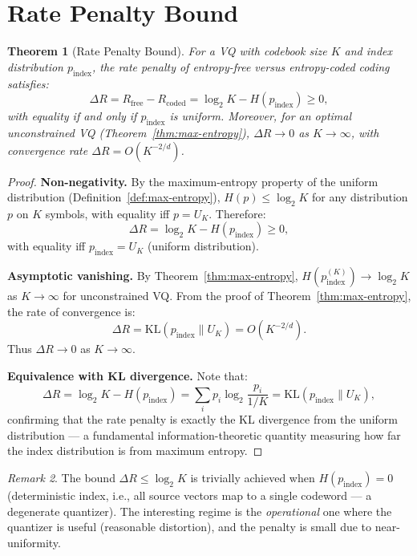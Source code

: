 \documentclass[11pt,a4paper]{article}
\newtheorem{theorem}{Theorem}[section]
\theoremstyle{definition}
\theoremstyle{remark}
\newtheorem{remark}[theorem]{Remark}
\newcommand{\KL}{\mathrm{KL}}
\begin{document}
\section{Rate Penalty Bound}

\begin{theorem}[Rate Penalty Bound]
\label{thm:rate-penalty}
For a VQ with codebook size $K$ and index distribution $p_{\mathrm{index}}$,
the rate penalty of entropy-free versus entropy-coded coding satisfies:
\[
\Delta R = R_{\mathrm{free}} - R_{\mathrm{coded}}
= \log_2 K - H(p_{\mathrm{index}}) \geq 0,
\]
with equality if and only if $p_{\mathrm{index}}$ is uniform.
Moreover, for an optimal unconstrained VQ (Theorem~\ref{thm:max-entropy}),
$\Delta R \to 0$ as $K \to \infty$, with convergence rate
$\Delta R = O(K^{-2/d})$.
\end{theorem}

\begin{proof}
\textbf{Non-negativity.} By the maximum-entropy property of the uniform
distribution (Definition~\ref{def:max-entropy}), $H(p) \le \log_2 K$ for
any distribution $p$ on $K$ symbols, with equality iff $p = U_K$.
Therefore:
\[
\Delta R = \log_2 K - H(p_{\mathrm{index}}) \ge 0,
\]
with equality iff $p_{\mathrm{index}} = U_K$ (uniform distribution).

\smallskip
\textbf{Asymptotic vanishing.} By Theorem~\ref{thm:max-entropy},
$H(p_{\mathrm{index}}^{(K)}) \to \log_2 K$ as $K \to \infty$ for
unconstrained VQ. From the proof of Theorem~\ref{thm:max-entropy},
the rate of convergence is:
\[
\Delta R = \KL(p_{\mathrm{index}} \| U_K) = O(K^{-2/d}).
\]
Thus $\Delta R \to 0$ as $K \to \infty$.

\smallskip
\textbf{Equivalence with KL divergence.} Note that:
\[
\Delta R = \log_2 K - H(p_{\mathrm{index}})
= \sum_i p_i \log_2 \frac{p_i}{1/K}
= \KL(p_{\mathrm{index}} \| U_K),
\]
confirming that the rate penalty is exactly the KL divergence from the
uniform distribution — a fundamental information-theoretic quantity
measuring how far the index distribution is from maximum entropy.
\end{proof}

\begin{remark}
The bound $\Delta R \le \log_2 K$ is trivially achieved when
$H(p_{\mathrm{index}}) = 0$ (deterministic index, i.e., all source vectors
map to a single codeword — a degenerate quantizer). The interesting regime
is the \emph{operational} one where the quantizer is useful (reasonable
distortion), and the penalty is small due to near-uniformity.
\end{remark}
\end{document}
